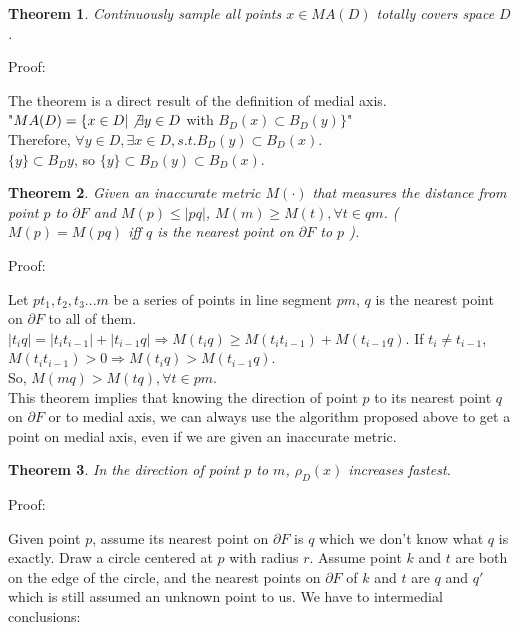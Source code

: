 \documentclass[12pt]{article}
\newtheorem{theorem}{Theorem}[section]
\begin{document}
  \begin{theorem}
  Continuously sample all points $x \in MA(D)$ totally covers space $D$.
  \end{theorem}
   
  Proof:
   
  The theorem is a direct result of the definition of medial axis. \\
  
  "$MA(D) = \{ x \in D | \not \exists y \in D$ with $B_D(x) \subset B_D(y) \}$"\\
  
  Therefore, $\forall y \in D, \exists x \in D, s.t. B_D(y) \subset B_D(x)$. \\
  
  $\{ y \} \subset B_D{y}$, so $\{ y \} \subset B_D(y) \subset B_D(x)$.\\
  
  \begin{theorem}
  Given an inaccurate metric $M(\cdot)$ that measures the distance from point $p$ to $\partial F$ and $M(p) \leq |pq|$, $M(m) \geq M(t), \forall t \in qm$. ($M(p)=M(pq)$ iff $q$ is the nearest point on $\partial F$ to $p$ ).
  \end{theorem}     
  
  Proof:
  
  Let $p t_1, t_2, t_3 ... m$ be a series of points in line segment $pm$, $q$ is the nearest point on $\partial F$ to all of them. $|t_{i}q| = |t_{i}t_{i-1}| + |t_{i-1}q| \Longrightarrow M(t_{i}q) \geq M(t_{i}t_{i-1}) + M(t_{i-1}q)$. If $t_{i} \neq t_{i-1}$, $M(t_{i}t_{i-1}) > 0 \Longrightarrow M(t_{i}q) > M(t_{i-1}q)$.\\
  
  So, $M(mq) > M(tq), \forall t \in pm$. \\
  
  This theorem implies that knowing the direction of point $p$ to its nearest point $q$ on $\partial F$ or to medial axis, we can always use the algorithm proposed above to get a point on medial axis, even if we are given an inaccurate metric.
  
  \begin{theorem}
  In the direction of point $p$ to $m$, $\rho_{D}(x)$ increases fastest.
  \end{theorem}
  Proof:
  
  Given point $p$, assume its nearest point on $\partial F$ is $q$ which we don't know what $q$ is exactly. Draw a circle centered at $p$ with radius $r$. Assume point $k$ and $t$ are both on the edge of the circle, and the nearest points on $\partial F$ of $k$ and $t$ are $q$ and $q'$ which is still assumed an unknown point to us. We have to intermedial conclusions:\\
  
\end{document}

